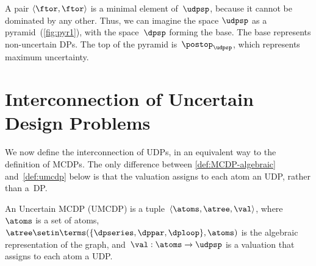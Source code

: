 A pair $\langle\ftor,\ftor\rangle$ is a minimal element of~$\udpsp$,
because it cannot be dominated by any other.
Thus, we can imagine
the space $\udpsp$ as a pyramid~(\cref{fig:pyr1}), with the
space~$\dpsp$ forming the base.
The base represents non-uncertain
DPs.
The top of the pyramid is~$\postop_{\udpsp}$, which represents
maximum uncertainty.

\section{Interconnection of Uncertain Design Problems\label{sec:UMCDP}}

We now define the interconnection of UDPs, in an equivalent way to
the definition of MCDPs.
The only difference between \cref{def:MCDP-algebraic}
and~\cref{def:umcdp} below is that the valuation assigns to
each atom an UDP, rather than a~DP.
\begin{definition}
    \label{def:umcdp}
    An Uncertain MCDP (UMCDP) is a tuple~$\left\langle \atoms,\atree,\val\right\rangle $,
    where~$\atoms$ is a set of atoms,~$\atree\setin\terms(\{\dpseries,\dppar,\dploop\},\atoms)$
    is the algebraic representation of the graph, and~$\val:\atoms\rightarrow\udpsp$
    is a valuation that assigns to each atom a UDP.
\end{definition}


